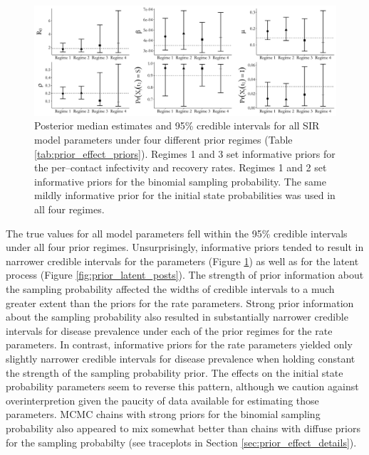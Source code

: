 \begin{figure}[htbp]
	\centering
	\includegraphics[width=\linewidth]{figures/prior_effect_credints.pdf}
	\caption[Posterior estimates of SIR model parameters under four prior regimes.]{Posterior median estimates and 95\% credible intervals for all SIR model parameters under four different prior regimes (Table \ref{tab:prior_effect_priors}). Regimes 1 and 3 set informative priors for the per--contact infectivity and recovery rates. Regimes 1 and 2 set informative priors for the binomial sampling probability. The same mildly informative prior for the initial state probabilities was used in all four regimes.}
	\label{fig:prior_credints}
\end{figure}

The true values for all model parameters fell within the 95\% credible intervals under all four prior regimes. Unsurprisingly, informative priors tended to result in narrower credible intervals for the parameters (Figure \ref{fig:prior_credints}) as well as for the latent process (Figure \ref{fig:prior_latent_posts}). The strength of prior information about the sampling probability affected the widths of credible intervals to a much greater extent than the priors for the rate parameters. Strong prior information about the sampling probability also resulted in substantially narrower credible intervals for disease prevalence under each of the prior regimes for the rate parameters. In contrast, informative priors for the rate parameters yielded only slightly narrower credible intervals for disease prevalence when holding constant the strength of the sampling probability prior. The effects on the initial state probability parameters seem to reverse this pattern, although we caution against overinterpretion given the paucity of data available for estimating those parameters. MCMC chains with strong priors for the binomial sampling probability also appeared to mix somewhat better than chains with diffuse priors for the sampling probabilty (see traceplots in Section \ref{sec:prior_effect_details}).

